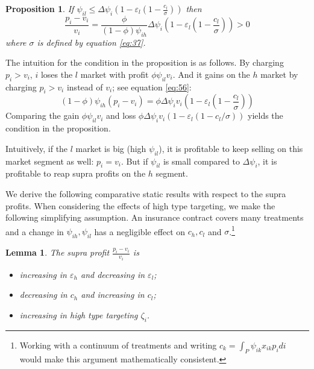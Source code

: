 \documentclass[12pt,english,a4paper]{article}
\newtheorem{lemma}{Lemma}
\newtheorem{proposition}{Proposition}
\begin{document}
\begin{proposition}
\label{Linear_price_above_value}
If \(\psi_{il} \leq \Delta \psi_i (1-\varepsilon_l (1-\frac{c_l}{\sigma}))\) then
\begin{equation}
\label{eq:56}
\frac{p_i-v_i}{v_i} = \frac{\phi}{(1-\phi)\psi_{ih}} \Delta \psi_i (1-\varepsilon_l (1-\frac{c_l}{\sigma})) > 0
\end{equation}
where \(\sigma\) is defined by equation \eqref{eq:37}.
\end{proposition}

The intuition for the condition in the proposition is as follows. By charging \(p_i > v_i\), \(i\) loses the \(l\) market with profit \(\phi \psi_{il} v_i\). And it gains on the \(h\) market by charging \(p_i > v_i\) instead of \(v_i\); see equation \eqref{eq:56}:
\begin{equation}
\label{eq:63}
(1-\phi) \psi_{ih} (p_i-v_i)= \phi \Delta \psi_i v_i (1-\varepsilon_l (1-\frac{c_l}{\sigma}))
\end{equation}
Comparing the gain \(\phi \psi_{il} v_i\) and loss \(\phi \Delta \psi_i v_i (1-\varepsilon_l (1-c_l/\sigma))\) yields the condition in the proposition.

Intuitively, if the \(l\) market is big (high \(\psi_{il}\)), it is profitable to keep selling on this market segment as well: \(p_i = v_i\). But if \(\psi_{il}\) is small compared to \(\Delta \psi_i\), it is profitable to reap supra profits on the \(h\) segment.

We derive the following comparative static results with respect to the supra profits. When considering the effects of high type targeting, we make the following simplifying assumption. An insurance contract covers many treatments and a change in \(\psi_{ih},\psi_{il}\) has a negligible effect on \(c_h, c_l\) and \(\sigma\).\footnote{Working with a continuum of treatments and writing \(c_k = \int_P \psi_{ik}x_{ik}p_idi\) would make this argument mathematically consistent.}

\begin{lemma}
\label{Linear_pricing_comparative_statics}
The supra profit \(\frac{p_i-v_i}{v_i}\) is
\begin{itemize}
\item increasing in \(\varepsilon_h\) and decreasing in \(\varepsilon_l\);
\item decreasing in \(c_h\) and increasing in \(c_l\);
\item increasing in high type targeting \(\zeta_i\).
\end{itemize}
\end{lemma}
\end{document}

